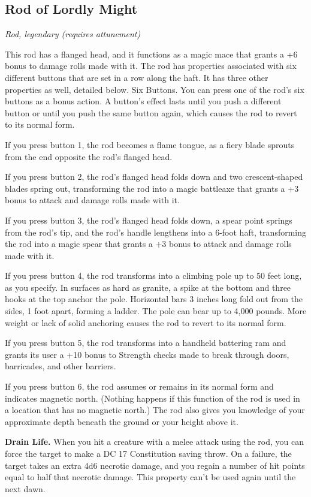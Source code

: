 \subsection{Rod of Lordly Might}
\textit{Rod, legendary (requires attunement)}

This rod has a flanged head, and it functions as a magic mace that grants a +6 bonus to damage rolls made with it. The rod has properties associated with six different buttons that are set in a row along the haft. It has three other properties as well, detailed below.
Six Buttons. You can press one of the rod's six buttons as a bonus action. A button's effect lasts until you push a different button or until you push the same button again, which causes the rod to revert to its normal form.  

If you press button 1, the rod becomes a flame tongue, as a fiery blade sprouts from the end opposite the rod's flanged head.  

If you press button 2, the rod's flanged head folds down and two crescent-shaped blades spring out, transforming the rod into a magic battleaxe that grants a +3 bonus to attack and damage rolls made with it.  

If you press button 3, the rod's flanged head folds down, a spear point springs from the rod's tip, and the rod's handle lengthens into a 6-foot haft, transforming the rod into a magic spear that grants a +3 bonus to attack and damage rolls made with it.

If you press button 4, the rod transforms into a climbing pole up to 50 feet long, as you specify. In surfaces as hard as granite, a spike at the bottom and three hooks at the top anchor the pole. Horizontal bars 3 inches long fold out from the sides, 1 foot apart, forming a ladder. The pole can bear up to 4,000 pounds. More weight or lack of solid anchoring causes the rod to revert to its normal form.

If you press button 5, the rod transforms into a handheld battering ram and grants its user a +10 bonus to Strength checks made to break through doors, barricades, and other barriers.

If you press button 6, the rod assumes or remains in its normal form and indicates magnetic north. (Nothing happens if this function of the rod is used in a location that has no magnetic north.) The rod also gives you knowledge of your approximate depth beneath the ground or your height above it.

\textbf{Drain Life.} When you hit a creature with a melee attack using the
rod, you can force the target to make a DC 17 Constitution saving throw. On a failure, the target takes an extra 4d6 necrotic damage, and you regain a number of hit points equal to half that necrotic damage. This property can't be used again until the next dawn.

